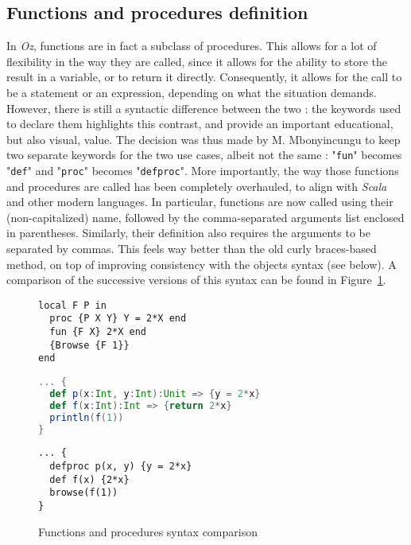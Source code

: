 \subsection{Functions and procedures definition}
In \textit{Oz}, functions are in fact a subclass of procedures.
This allows for a lot of flexibility in the way they are called, since it allows for the ability to store the result in a variable, or to return it directly.
Consequently, it allows for the call to be a statement or an expression, depending on what the situation demands.\newline
However, there is still a syntactic difference between the two : the keywords used to declare them highlights this contrast, and provide an important educational, but also visual, value.
The decision was thus made by M. Mbonyincungu to keep two separate keywords for the two use cases, albeit not the same : "\texttt{fun}" becomes "\texttt{def}" and "\texttt{proc}" becomes "\texttt{defproc}".\newline
More importantly, the way those functions and procedures are called has been completely overhauled, to align with \textit{Scala} and other modern languages.
In particular, functions are now called using their (non-capitalized) name, followed by the comma-separated arguments list enclosed in parentheses.
Similarly, their definition also requires the arguments to be separated by commas.
This feels way better than the old curly braces-based method, on top of improving consistency with the objects syntax (see below).\newline
A comparison of the successive versions of this syntax can be found in Figure~\ref{fig:code-comp-fun}.
\begin{figure}
    \noindent\begin{minipage}{.49\textwidth}
\begin{lstlisting}[title={Oz},language=oz]
local F P in
  proc {P X Y} Y = 2*X end
  fun {F X} 2*X end
  {Browse {F 1}}
end
\end{lstlisting}
    \end{minipage}
    \hfill
    \noindent\begin{minipage}{.49\textwidth}
\begin{lstlisting}[title={Scala/Ozma},language=scala]
... {
  def p(x:Int, y:Int):Unit => {y = 2*x}
  def f(x:Int):Int => {return 2*x}
  println(f(1))
}
\end{lstlisting}
    \end{minipage}
    \begin{center}
    \noindent\begin{minipage}{.89\textwidth}
\begin{lstlisting}[title={NewOz 2020/2021},language=newoz]
... {
  defproc p(x, y) {y = 2*x}
  def f(x) {2*x}
  browse(f(1))
}
\end{lstlisting}
    \end{minipage}
    \end{center}
\caption{Functions and procedures syntax comparison}
\label{fig:code-comp-fun}
\end{figure}

